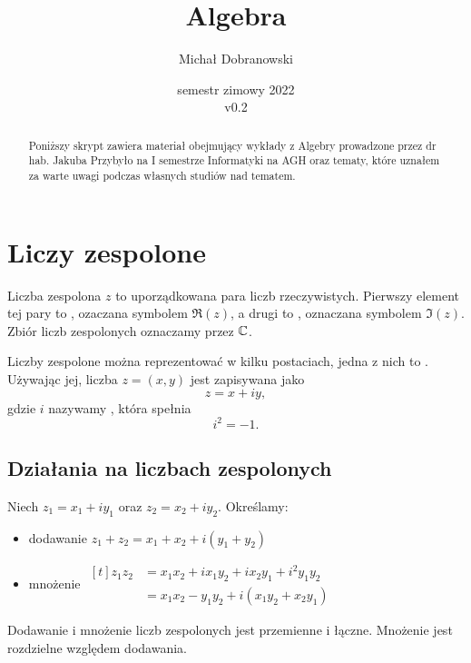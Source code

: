 \documentclass[11pt]{scrartcl}
\title{Algebra}
\author{Michał Dobranowski}
\date{semestr zimowy 2022 \\ v0.2}
\begin{document}
    \maketitle
    \begin{abstract}
        Poniższy skrypt zawiera materiał obejmujący wykłady z Algebry prowadzone przez dr hab. Jakuba Przybyło na I semestrze Informatyki na AGH oraz tematy, które uznałem za warte uwagi podczas własnych studiów nad tematem.
    \end{abstract}
    \tableofcontents
    \eject

    \section{Liczy zespolone}
    \begin{definition}
        Liczba zespolona $z$ to uporządkowana para liczb rzeczywistych. Pierwszy element tej pary to , ozaczana symbolem $\Re(z)$, a drugi to , oznaczana symbolem $\Im(z)$. Zbiór liczb zespolonych oznaczamy przez $\mathbb C$.
    \end{definition}

    Liczby zespolone można reprezentować w kilku postaciach, jedna z nich to . Używając jej, liczba $z = (x, y)$ jest zapisywana jako
    $$ z = x + iy, $$
    gdzie $i$ nazywamy , która spełnia
    $$ i^2 = -1. $$

    \subsection{Działania na liczbach zespolonych}
    Niech $z_1 = x_1 + iy_1$ oraz $z_2 = x_2 + iy_2$. Określamy:
    \begin{itemize}
        \item dodawanie $z_1 + z_2 = x_1 + x_2 + i(y_1 + y_2)$
        \item mnożenie $\begin{aligned}[t] z_1z_2 &= x_1x_2 + ix_1y_2 + ix_2y_1 + i^2y_1y_2 \\ &= x_1x_2 - y_1y_2 + i(x_1y_2 + x_2y_1)\end{aligned}$
    \end{itemize}

    \begin{corollary}
        Dodawanie i mnożenie liczb zespolonych jest przemienne i łączne. Mnożenie jest rozdzielne względem dodawania.
    \end{corollary}
\end{document}
